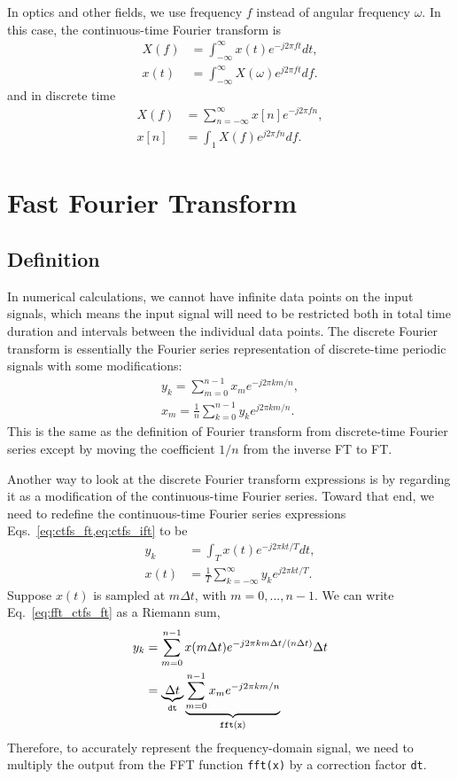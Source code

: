 \documentclass{article}
\begin{document}
In optics and other fields, we use frequency $f$ instead of angular frequency $\omega$. In this case, the continuous-time Fourier transform is
\begin{align}
    X(f) &= \int_{-\infty}^\infty x(t)e^{-j 2\pi f t}dt,\\
    x(t) &= \int_{-\infty}^\infty X(\omega) e^{j 2\pi f t} df.
\end{align}
and in discrete time
\begin{align}
    X(f) &= \sum_{n=-\infty}^\infty x[n] e^{-j2\pi f n},\\
    x[n] &= \int_1 X(f) e^{j2\pi f n} df.
\end{align}

\section{Fast Fourier Transform}

\subsection{Definition}

In numerical calculations, we cannot have infinite data points on the input signals, which means 
the input signal will need to be restricted both in total time duration and intervals between the 
individual data points. The discrete Fourier transform is essentially the Fourier series
representation of discrete-time periodic signals with some modifications:
\begin{align}
    y_k = \sum_{m=0}^{n-1} x_m e^{-j2\pi km/n}, \label{eq:y_k} \\
    x_m = \frac{1}{n} \sum_{k=0}^{n-1} y_k e^{j2\pi km/n}. \label{eq:x_m}
\end{align}
This is the same as the definition of Fourier transform from discrete-time Fourier series except by
moving the coefficient $1/n$ from the inverse FT to FT.

Another way to look at the discrete Fourier transform expressions is by regarding it as a modification
of the continuous-time Fourier series. Toward that end, we need to redefine the continuous-time Fourier
series expressions Eqs.~\cref{eq:ctfs_ft,eq:ctfs_ift} to be
\begin{align}
    y_k &= \int_T x(t) e^{-j2\pi kt/T}dt, \label{eq:fft_ctfs_ft} \\
    x(t) &= \frac{1}{T} \sum_{k=-\infty}^\infty y_k e^{j2\pi kt/T}. \label{eq:fft_ctfs_ift}
\end{align}
Suppose $x(t)$ is sampled at $m\Delta t$, with $m = 0, ..., n-1$. We can write Eq.~\ref{eq:fft_ctfs_ft}
as a Riemann sum,
\begin{align}
    y_k &= \sum_{m=0}^{n-1} x(m\Delta t) e^{-j2\pi km\Delta t / (n\Delta t)} \Delta t\\
        &= \underbrace{\Delta t}_{{\tt dt}} \underbrace{\sum_{m=0}^{n-1} x_m e^{-j2\pi km / n}}_{{\tt fft(x)}} \\
\end{align}
Therefore, to accurately represent the frequency-domain signal, we need to multiply the output from
the FFT function {\tt fft(x)} by a correction factor {\tt dt}.
\end{document}
